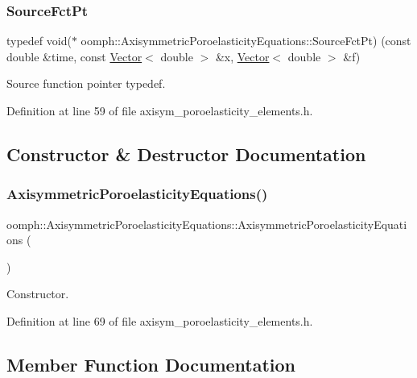 \subsubsection{\texorpdfstring{Source\+Fct\+Pt}{SourceFctPt}}
{\footnotesize\ttfamily typedef void($\ast$ oomph\+::\+Axisymmetric\+Poroelasticity\+Equations\+::\+Source\+Fct\+Pt) (const double \&time, const \hyperlink{classoomph_1_1Vector}{Vector}$<$ double $>$ \&x, \hyperlink{classoomph_1_1Vector}{Vector}$<$ double $>$ \&f)}



Source function pointer typedef. 



Definition at line 59 of file axisym\+\_\+poroelasticity\+\_\+elements.\+h.



\subsection{Constructor \& Destructor Documentation}
\mbox{\label{classoomph_1_1AxisymmetricPoroelasticityEquations_a4dc47e5296f523f13d704194bd3b893f}} 
\subsubsection{\texorpdfstring{Axisymmetric\+Poroelasticity\+Equations()}{AxisymmetricPoroelasticityEquations()}}
{\footnotesize\ttfamily oomph\+::\+Axisymmetric\+Poroelasticity\+Equations\+::\+Axisymmetric\+Poroelasticity\+Equations (\begin{DoxyParamCaption}{ }\end{DoxyParamCaption})\hspace{0.3cm}{\ttfamily [inline]}}



Constructor. 



Definition at line 69 of file axisym\+\_\+poroelasticity\+\_\+elements.\+h.



\subsection{Member Function Documentation}
\mbox{\label{classoomph_1_1AxisymmetricPoroelasticityEquations_acde1907eed1f77a11184d71adaa89e76}} 
